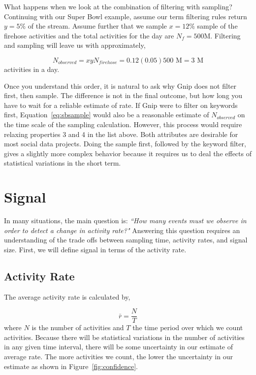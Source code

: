\documentclass{article}
\begin{document}
What happens when we look at the combination of filtering with sampling?  Continuing with our Super Bowl example, 
assume our term filtering rules return $y=5\%$ of the stream. Assume further that we sample $x=12\%$ sample of 
the firehose activities and the total activities for the day are $N_f=500$M. Filtering and sampling will leave us with 
approximately,

\begin{equation}
    \label{eq:sbsample}
    N_{observed} = x y N_{firehose}= 0.12 (0.05) 500 \textrm{ M} = 3 \textrm{ M}
\end{equation}
activities in a day. 

Once you understand this order, it is natural to ask why Gnip does not filter first, then sample. The difference is not
in the final outcome, but how long you have to wait for a reliable estimate of rate. If Gnip were to filter on keywords
first, Equation~\ref{eq:sbsample} would also be a reasonable estimate of $N_{observed}$ on the time scale of the 
sampling calculation. However, this process would require relaxing properties 3 and 4 in the list above. Both attributes
are desirable for most social data projects. Doing the sample first, followed by the keyword filter, gives a slightly
more complex behavior because it requires us to deal the effects of statistical variations in the short term.

\section{Signal} 

In many situations, the main question is: \emph{``How many events must we observe in order to detect a change in activity rate?"} Answering
this question requires an understanding of the trade offs between sampling time, activity rates, and signal size.  First, 
we will define signal in terms of the activity rate.

\subsection{Activity Rate} 

The average activity rate is calculated by,

\begin{equation}
    \label{eq:rateEst}
    \bar{r} = \frac{N}{T}
\end{equation}
where $N$ is the number of activities and $T$ the time period over which we count activities.  Because there will be statistical
variations in the number of activities in any given time interval, there will be some uncertainty in our estimate of average rate. 
The more activities we count, the lower the uncertainty in our estimate as shown in Figure~\ref{fig:confidence}.
\end{document}
